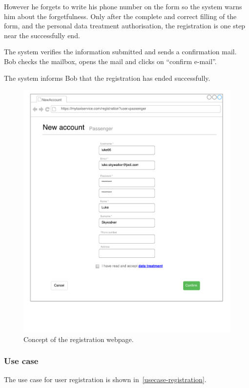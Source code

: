 However he forgets to write his phone number on the form so the system warns him about the forgetfulness.
Only after the complete and correct filling of the form, and the personal data treatment authorisation, the registration is one step near the successfully end.

The system verifies the information submitted and sends a confirmation mail.
Bob checks the mailbox, opens the mail and clicks on ``confirm e-mail''.

The system informs Bob that the registration has ended successfully.

\begin{figure}
\includegraphics[width=\textwidth]{mockup/Registration.pdf}
\caption{Concept of the registration webpage.}
\label{fig:mockup-registration}
\end{figure}


\subsubsection{Use case}
The use case for user registration is shown in~\autoref{usecase-registration}.

